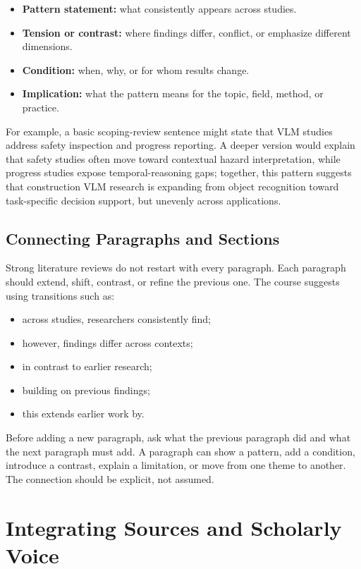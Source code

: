 \documentclass[10pt,letterpaper]{article}
\begin{document}
\begin{itemize}
\item \textbf{Pattern statement:} what consistently appears across studies.
\item \textbf{Tension or contrast:} where findings differ, conflict, or emphasize different dimensions.
\item \textbf{Condition:} when, why, or for whom results change.
\item \textbf{Implication:} what the pattern means for the topic, field, method, or practice.
\end{itemize}

For example, a basic scoping-review sentence might state that VLM studies address safety inspection and progress reporting. A deeper version would explain that safety studies often move toward contextual hazard interpretation, while progress studies expose temporal-reasoning gaps; together, this pattern suggests that construction VLM research is expanding from object recognition toward task-specific decision support, but unevenly across applications.

\subsection{Connecting Paragraphs and Sections}

Strong literature reviews do not restart with every paragraph. Each paragraph should extend, shift, contrast, or refine the previous one. The course suggests using transitions such as:

\begin{itemize}
\item across studies, researchers consistently find;
\item however, findings differ across contexts;
\item in contrast to earlier research;
\item building on previous findings;
\item this extends earlier work by.
\end{itemize}

Before adding a new paragraph, ask what the previous paragraph did and what the next paragraph must add. A paragraph can show a pattern, add a condition, introduce a contrast, explain a limitation, or move from one theme to another. The connection should be explicit, not assumed.

\section{Integrating Sources and Scholarly Voice}
\end{document}
